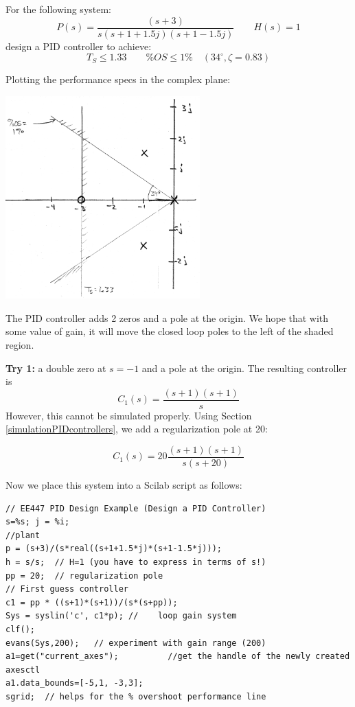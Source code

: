 \begin{Example}
For the following system:
\[
P(s) = \frac {(s+3)} {s(s+1+1.5j)(s+1-1.5j)}  \qquad   H(s) = 1
\]
design a PID controller to achieve:
\[
T_S \leq 1.33 \qquad \%OS \leq 1\% \quad (34^\circ, \zeta = 0.83)
\]

Plotting the performance specs in the complex plane:

\begin{center}
\includegraphics[width=75mm]{figs11/00928a.png}
\end{center}

The PID controller adds 2 zeros and a pole at the origin.   We hope that with some value of gain, it will move the closed loop poles to the left of the shaded region.

{\bf Try 1: } a double zero at $s=-1$ and a pole at the origin.   The resulting controller is
\[
C_1(s) = \frac{(s+1)(s+1)}{s}
\]
However, this cannot be simulated properly.   Using Section \ref{simulationPIDcontrollers}, we add a regularization pole at 20:

\[
C_1(s) = 20\frac{(s+1)(s+1)}{s(s+20)}
\]

Now we place this system into a Scilab script as follows:

\begin{verbatim}// EE447 PID Design Example (Design a PID Controller)
s=%s; j = %i;
//plant
p = (s+3)/(s*real((s+1+1.5*j)*(s+1-1.5*j)));
h = s/s;  // H=1 (you have to express in terms of s!)
pp = 20;  // regularization pole
// First guess controller
c1 = pp * ((s+1)*(s+1))/(s*(s+pp));
Sys = syslin('c', c1*p); //    loop gain system
clf();
evans(Sys,200);   // experiment with gain range (200)
a1=get("current_axes");          //get the handle of the newly created axesctl
a1.data_bounds=[-5,1, -3,3];
sgrid;  // helps for the % overshoot performance line
\end{verbatim}
\end{Example}

